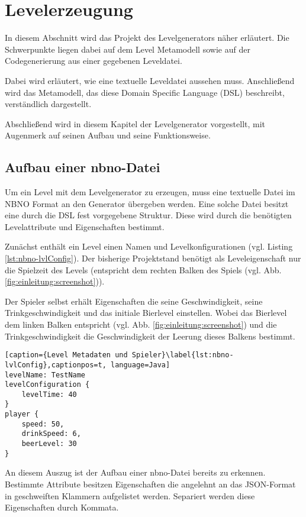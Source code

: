 \section{Levelerzeugung}\label{sec:levelerzeugung}

In diesem Abschnitt wird das Projekt des Levelgenerators näher erläutert. Die Schwerpunkte liegen dabei auf dem Level Metamodell sowie auf der Codegenerierung aus einer gegebenen Leveldatei. 
 
Dabei wird erläutert, wie eine textuelle Leveldatei aussehen muss. Anschließend wird das Metamodell, das diese  Domain Specific Language (DSL) beschreibt, verständlich dargestellt.

Abschließend wird in diesem Kapitel der Levelgenerator vorgestellt, mit Augenmerk auf seinen Aufbau und seine Funktionsweise.

\subsection{Aufbau einer nbno-Datei}
Um ein Level mit dem Levelgenerator zu erzeugen, muss eine textuelle Datei im NBNO Format an den Generator übergeben werden. Eine solche Datei besitzt eine durch die DSL fest vorgegebene Struktur. Diese wird durch die benötigten Levelattribute und Eigenschaften bestimmt.

Zunächst enthält ein Level einen Namen und Levelkonfigurationen (vgl. Listing \ref{lst:nbno-lvlConfig}). Der bisherige Projektstand benötigt als Leveleigenschaft nur die Spielzeit des Levels (entspricht dem rechten Balken des Spiels (vgl. Abb. \ref{fig:einleitung:screenshot})).

Der Spieler selbst erhält Eigenschaften die seine Geschwindigkeit, seine Trinkgeschwindigkeit und das initiale Bierlevel einstellen. Wobei das Bierlevel dem linken Balken entspricht (vgl. Abb. \ref{fig:einleitung:screenshot}) und die Trinkgeschwindigkeit die Geschwindigkeit der Leerung dieses Balkens bestimmt.

\begin{lstlisting}[caption={Level Metadaten und Spieler}\label{lst:nbno-lvlConfig},captionpos=t, language=Java]
levelName: TestName
levelConfiguration {
    levelTime: 40
}
player {
    speed: 50,
    drinkSpeed: 6,
    beerLevel: 30
}
\end{lstlisting}

An diesem Auszug ist der Aufbau einer nbno-Datei bereits zu erkennen.
Bestimmte Attribute besitzen Eigenschaften die angelehnt an das JSON-Format in geschweiften Klammern aufgelistet werden. Separiert werden diese Eigenschaften durch Kommata.

